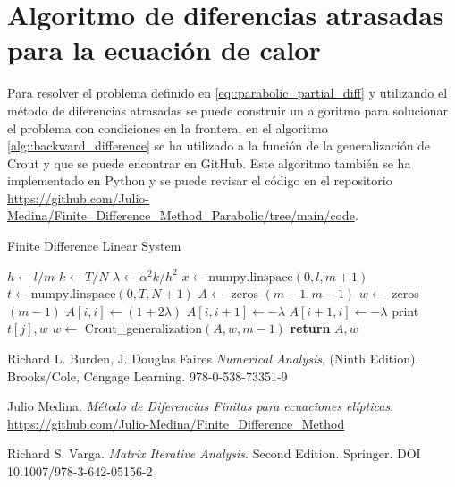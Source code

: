 \documentclass[a4paper]{article}
\begin{document}
\section{Algoritmo de diferencias atrasadas para la ecuación de calor}
Para resolver el problema definido en \ref{eq::parabolic_partial_diff} y utilizando el método de diferencias atrasadas se puede construir un algoritmo para solucionar el problema con condiciones en la frontera, en el algoritmo \ref{alg::backward_difference} se ha utilizado a la función de la generalización de Crout \cite{Medina} y que se puede encontrar en GitHub. Este algoritmo también se ha implementado en Python y se puede revisar el código en el repositorio
\url{https://github.com/Julio-Medina/Finite_Difference_Method_Parabolic/tree/main/code}.
\begin{algorithm}[H]
\caption{Finite Difference Linear System}\label{alg::backward_difference}
\begin{algorithmic}[H]
\State $h \gets l/m$
\State $k \gets T/N$
\State $\lambda \gets \alpha^2 k /h^2$
\State $x\gets \text{numpy.linspace}(0, l, m+1)$
\State $t \gets \text{numpy.linspace}(0, T, N+1)$
\State $A \gets$ zeros $(m-1,m-1)$
\State $w \gets$ zeros $(m-1)$
\State $A[i,i]\gets (1+2\lambda)$
\State $A[i,i+1]\gets-\lambda$
\State $A[i+1,i]\gets-\lambda$
\EndIf
\EndFor
{}
\State print $t[j],w$
\State $w \gets$ Crout\_generalization$(A,w,m-1)$
\EndFor
\State \textbf{return} $A, w$
\EndFunction
\end{algorithmic}
\end{algorithm}


\begin{thebibliography}{99}


 Richard L. Burden, J. Douglas Faires \textit{Numerical Analysis}, (Ninth Edition). Brooks/Cole, Cengage Learning. 978-0-538-73351-9

 Julio Medina. \textit{Método de Diferencias Finitas para ecuaciones elípticas}. \url{https://github.com/Julio-Medina/Finite_Difference_Method}

 Richard S. Varga. \textit{Matrix Iterative Analysis}. Second Edition. Springer. DOI 10.1007/978-3-642-05156-2






\end{thebibliography}
\end{document}

